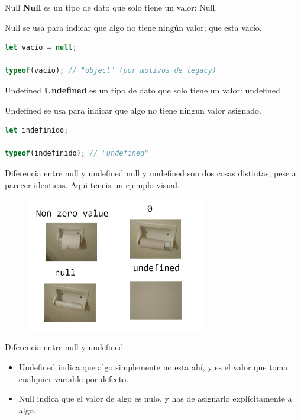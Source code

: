 \documentclass{beamer}
\begin{document}
\begin{frame}[fragile]{Null}
\textbf{Null} es un tipo de dato que solo tiene un valor: Null.

Null se usa para indicar que algo no tiene ningún valor; que esta vacío.

\begin{lstlisting}[language=JavaScript]
let vacio = null;

typeof(vacio); // "object" (por motivos de legacy)

\end{lstlisting}
\end{frame}

\begin{frame}[fragile]{Undefined}
\textbf{Undefined} es un tipo de dato que solo tiene un valor: undefined.

Undefined se usa para indicar que algo no tiene ningun valor asignado.

\begin{lstlisting}[language=JavaScript]
let indefinido;

typeof(indefinido); // "undefined"
\end{lstlisting}
\end{frame}

\begin{frame}{Diferencia entre null y undefined}
null y undefined son dos cosas distintas, pese a parecer identicas. Aqui teneis un ejemplo visual.

    \begin{figure}
        \centering
        \includegraphics[width=0.7\textwidth]{images/undefinednull.png}
    \end{figure}
\end{frame}

\begin{frame}{Diferencia entre null y undefined}
\begin{itemize}
    \item Undefined indica que algo simplemente no esta ahí, y es el valor que toma cualquier variable por defecto.
    \item Null indica que el valor de algo es nulo, y has de asignarlo explícitamente a algo.
\end{itemize}
\end{frame}
\end{document}
